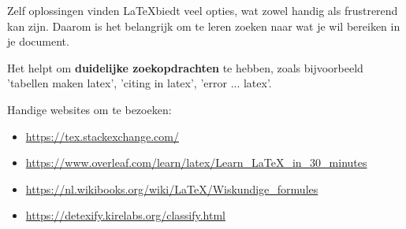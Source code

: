 
\begin{frame}{Zelf oplossingen vinden}
	\LaTeX biedt veel opties, wat zowel handig als frustrerend kan zijn. Daarom is het belangrijk om te leren zoeken naar wat je wil bereiken in je document. 
	
	Het helpt om \textbf{duidelijke zoekopdrachten} te hebben, zoals bijvoorbeeld 'tabellen maken latex', 'citing in latex', 'error ... latex'. 
	
	Handige websites om te bezoeken:
	\begin{itemize}[label=\textbullet]
		\item \url{https://tex.stackexchange.com/}
		\item \url{https://www.overleaf.com/learn/latex/Learn_LaTeX_in_30_minutes}
		\item \url{https://nl.wikibooks.org/wiki/LaTeX/Wiskundige_formules}
		\item \url{https://detexify.kirelabs.org/classify.html}
	\end{itemize}
\end{frame}